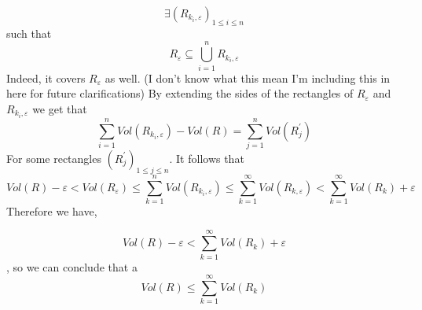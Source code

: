 \documentclass{tufte-handout}
\begin{document}
$$ \exists (R_{k_i, \varepsilon})_{1 \leq i \leq n}$$ 
such that $$R_\varepsilon \subseteq \bigcup_{i = 1}^n R_{k_i, \varepsilon}$$
Indeed, it covers $R_\varepsilon$ as well.
(I don't know what this mean I'm including this in here for future clarifications) By extending the sides of the rectangles of $R_\varepsilon$ and $R_{k_i, \varepsilon}$ we get that 
$$\sum_{i = 1}^n Vol(R_{k_i, \varepsilon}) - Vol(R) = \sum_{j = 1}^n Vol(R_j^\prime) $$ 
For some rectangles $(R_j^\prime)_{1 \leq j \leq n}$. 
It follows that 
$$Vol(R) - \varepsilon < Vol(R_\varepsilon) \leq \sum_{k=1}^n Vol(R_{k_i, \varepsilon}) \leq \sum_{k=1}^\infty Vol(R_{k, \varepsilon}) < \sum_{k = 1}^\infty Vol(R_k) + \varepsilon$$
Therefore we have,

$$Vol(R) - \varepsilon <  \sum_{k = 1}^\infty Vol(R_k) + \varepsilon $$, so we can conclude that a
$$Vol(R) \leq  \sum_{k = 1}^\infty Vol(R_k) $$
\end{document}
